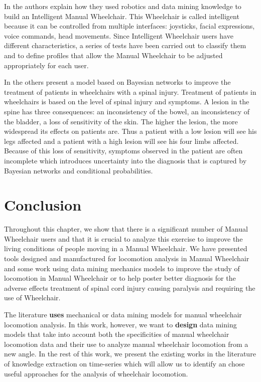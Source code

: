 In \cite{faria2012patient} the authors explain how they used robotics and data mining knowledge to build an Intelligent Manual Wheelchair. This Wheelchair is called intelligent because it can be controlled from multiple interfaces: joysticks, facial expressions, voice commands, head movements.  Since Intelligent Wheelchair users have different characteristics, a series of tests have been carried out to classify them and to define profiles that allow the Manual Wheelchair to be adjusted appropriately for each user.

In \cite{athanasiou2009bayesian} the others present a model based on Bayesian networks to improve the treatment of patients in wheelchairs with a spinal injury. Treatment of patients in wheelchairs is based on the level of spinal injury and symptoms. A lesion in the spine has three consequences: an inconsistency of the bowel, an inconsistency of the bladder, a loss of sensitivity of the skin. The higher the lesion, the more widespread its effects on patients are. Thus a patient with a low lesion will see his legs affected and a patient with a high lesion will see his four limbs affected. Because of this loss of sensitivity, symptoms observed in the patient are often incomplete which introduces uncertainty into the diagnosis that is captured by Bayesian networks and conditional probabilities.





\section{Conclusion}



Throughout this chapter, we show that there is a significant number of Manual Wheelchair users and that it is crucial to analyze this exercise to improve the living conditions of people moving in a Manual Wheelchair. We have presented tools designed and manufactured for locomotion analysis in Manual Wheelchair and some work using data mining mechanics models to improve the study of locomotion in Manual Wheelchair or to help poster better diagnosis for the adverse effects treatment of spinal cord injury causing paralysis and requiring the use of Wheelchair. 


The literature \textbf{uses} mechanical or data mining models for manual wheelchair locomotion analysis.  In this work, however, we want to \textbf{design} data mining models that take into account both the specificities of manual wheelchair locomotion data and their use to analyze manual wheelchair locomotion from a new angle. In the rest of this work, we present the existing works in the literature of knowledge extraction on time-series which will allow us to identify an chose useful approaches for the analysis of wheelchair locomotion.







